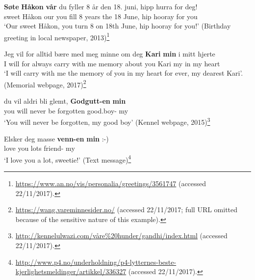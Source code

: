 \documentclass[output=paper]{langsci/langscibook}
\begin{document}
		\ex
		\gll \textbf{S\o{}te } \textbf{H\aa{}kon} \textbf{v\aa{}r} du fyller 8 \aa{}r den 18. juni, hipp hurra for deg!\\
		sweet H\aa{}kon our you fill 8 years the 18 June, hip hooray for you\\
	\glt `Our sweet H\aa{}kon, you turn 8 on  18th  June, hip hooray for you!'
    (Birthday greeting in local newspaper,
2013)\footnote{\url{https://www.an.no/vis/personalia/greetings/3561747} (accessed 22/11/2017).} %

		\ex

\gll Jeg vil for alltid b\ae{}re med meg minne om deg \textbf{Kari} \textbf{min} i mitt hjerte\\
I will for always carry with me memory about you Kari my in my heart\\
\glt `I will carry with me the memory of you in my heart for ever, my dearest
Kari'. (Memorial webpage, 2017)\footnote{\url{https://wang.vareminnesider.no/}
(accessed 22/11/2017; full URL omitted because of the sensitive nature of this
example).}

    \ex
\gll  [...] du vil aldri bli glemt, \textbf{Godgutt-en} \textbf{min}\\
{} you will never be forgotten good.boy-\Def{} my\\
\glt `You will never be forgotten, my good boy' (Kennel webpage,
2015)\footnote{\url{http://kennelulwazi.com/våre\%20hunder/gandhi/index.html} (accessed 22/11/2017).}

    \ex
\gll [...] Elsker deg masse \textbf{venn-en} \textbf{min} :-)\\
{} love you lots friend-\Def{} my\\
\glt `I love you a lot, sweetie!' (Text message)\footnote{\url{http://www.p4.no/underholdning/p4-lytternes-beste-kjerlighetsmeldinger/artikkel/336327} (accessed 22/11/2017).}

    \z
\z\largerpage[-2]
\end{document}

